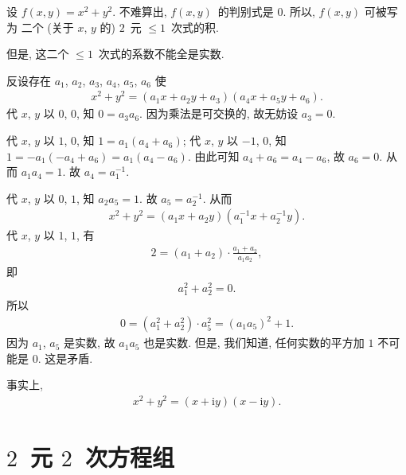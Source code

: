 \documentclass[%
    UTF8,%
    fontset=none,%
    punct=kaiming,%
    zihao=-4,%
    a4paper,%
    oneside,%
]{ctexbook}
\let\emph\relax
\renewcommand*{\leq}{\leqslant}
\begin{document}
\begin{example}
    设 \(f(x, y) = x^2 + y^2\).
    不难算出, \(f(x, y)\)~的判别式是 \(0\).
    所以, \(f(x, y)\) 可被写为%
    二个 (关于 \(x\), \(y\) 的)
    \(2\)~元 \({\leq} 1\)~次式的积.

    但是, 这二个 \({\leq} 1\)~次式的系数不能全是实数.

    反设存在\emph{实数}
    \(a_1\), \(a_2\), \(a_3\), \(a_4\), \(a_5\), \(a_6\) 使
    \begin{align*}
        x^2 + y^2 = (a_1 x + a_2 y + a_3) (a_4 x + a_5 y + a_6).
    \end{align*}
    代 \(x\), \(y\) 以 \(0\), \(0\), 知 \(0 = a_3 a_6\).
    因为乘法是可交换的, 故无妨设 \(a_3 = 0\).

    代 \(x\), \(y\) 以 \(1\), \(0\), 知
    \(1 = a_1 (a_4 + a_6)\);
    代 \(x\), \(y\) 以 \(-1\), \(0\), 知
    \(1 = -a_1 (-a_4 + a_6) = a_1 (a_4 - a_6)\).
    由此可知 \(a_4 + a_6 = a_4 - a_6\),
    故 \(a_6 = 0\).
    从而 \(a_1 a_4 = 1\).
    故 \(a_4 = a_1^{-1}\).

    代 \(x\), \(y\) 以 \(0\), \(1\), 知 \(a_2 a_5 = 1\).
    故 \(a_5 = a_2^{-1}\).
    从而
    \begin{align*}
        x^2 + y^2 = (a_1 x + a_2 y) (a_1^{-1} x + a_2^{-1} y).
    \end{align*}
    代 \(x\), \(y\) 以 \(1\), \(1\), 有
    \begin{align*}
        2 = (a_1 + a_2) \cdot \frac{a_1 + a_2}{a_1 a_2},
    \end{align*}
    即
    \begin{align*}
        a_1^2 + a_2^2 = 0.
    \end{align*}
    所以
    \begin{align*}
        0
        = (a_1^2 + a_2^2) \cdot a_5^2
        = (a_1 a_5)^2 + 1.
    \end{align*}
    因为 \(a_1\), \(a_5\) 是实数, 故 \(a_1 a_5\) 也是实数.
    但是, 我们知道,
    任何实数的平方加 \(1\) 不可能是 \(0\).
    这是矛盾.

    事实上,
    \begin{align*}
        x^2 + y^2 = (x + \mathrm{i} y) (x - \mathrm{i} y).
    \end{align*}
\end{example}

\section{\texorpdfstring{\(2\)~元 \(2\)~次方程组}%
  {2 元 2 次方程组}}
\end{document}
